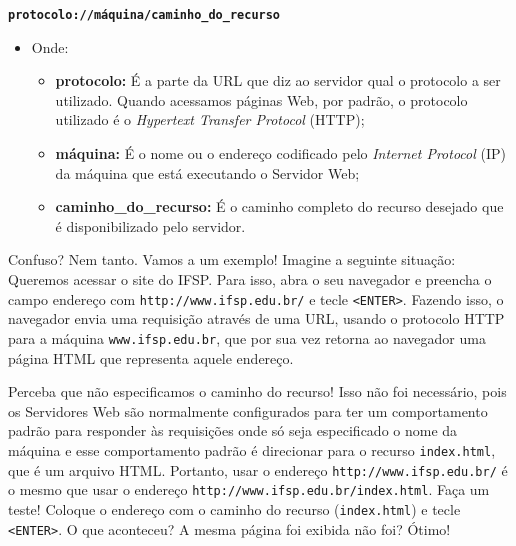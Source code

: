 \begin{center}
    \textbf{\texttt{protocolo://máquina/caminho\_do\_recurso}}
\end{center}

\begin{itemize}
    
    \item Onde:
    
    \begin{itemize}
    
        \item \textbf{protocolo:} É a parte da URL que diz ao servidor qual o protocolo a ser utilizado. Quando acessamos páginas Web, por padrão, o protocolo utilizado é o \textit{Hypertext Transfer Protocol} (HTTP);
        
        \item \textbf{máquina:} É o nome ou o endereço codificado pelo \textit{Internet Protocol} (IP) da máquina que está executando o Servidor Web;
        
        \item \textbf{caminho\_do\_recurso:} É o caminho completo do recurso desejado que é disponibilizado pelo servidor.
        
    \end{itemize}
    
\end{itemize}

Confuso? Nem tanto. Vamos a um exemplo! Imagine a seguinte situação: Queremos acessar o site do IFSP. Para isso, abra o seu navegador e preencha o campo endereço com \texttt{http://www.ifsp.edu.br/} e tecle \texttt{<ENTER>}. Fazendo isso, o navegador envia uma requisição através de uma URL, usando o protocolo HTTP para a máquina \texttt{www.ifsp.edu.br}, que por sua vez retorna ao navegador uma página HTML que representa aquele endereço. 

Perceba que não especificamos o caminho do recurso! Isso não foi necessário, pois os Servidores Web são normalmente configurados para ter um comportamento padrão para responder às requisições onde só seja especificado o nome da máquina e esse comportamento padrão é direcionar para o recurso \texttt{index.html}, que é um arquivo HTML. Portanto, usar o endereço \texttt{http://www.ifsp.edu.br/} é o mesmo que usar o endereço \texttt{http://www.ifsp.edu.br/index.html}. Faça um teste! Coloque o endereço com o caminho do recurso (\texttt{index.html}) e tecle \texttt{<ENTER>}. O que aconteceu? A mesma página foi exibida não foi? Ótimo!

